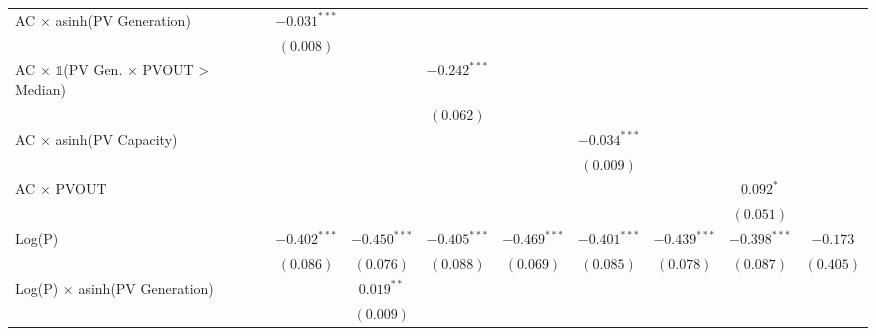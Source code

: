 \begin{table}[htbp]
\begin{center}
\begin{tabular}{l c c c c c c c c}
AC $\times$ asinh(PV Generation)                          & $-0.031^{***}$ &                &                &                &                &                &                &               \\
                                                          & $(0.008)$      &                &                &                &                &                &                &               \\
AC $\times$ $\mathds{1}$(PV Gen. $\times$ PVOUT > Median) &                &                & $-0.242^{***}$ &                &                &                &                &               \\
                                                          &                &                & $(0.062)$      &                &                &                &                &               \\
AC $\times$ asinh(PV Capacity)                            &                &                &                &                & $-0.034^{***}$ &                &                &               \\
                                                          &                &                &                &                & $(0.009)$      &                &                &               \\
AC $\times$ PVOUT                                         &                &                &                &                &                &                & $0.092^{*}$    &               \\
                                                          &                &                &                &                &                &                & $(0.051)$      &               \\
Log(P)                                                    & $-0.402^{***}$ & $-0.450^{***}$ & $-0.405^{***}$ & $-0.469^{***}$ & $-0.401^{***}$ & $-0.439^{***}$ & $-0.398^{***}$ & $-0.173$      \\
                                                          & $(0.086)$      & $(0.076)$      & $(0.088)$      & $(0.069)$      & $(0.085)$      & $(0.078)$      & $(0.087)$      & $(0.405)$     \\
Log(P) $\times$ asinh(PV Generation)                      &                & $0.019^{**}$   &                &                &                &                &                &               \\
                                                          &                & $(0.009)$      &                &                &                &                &                &               \\

\end{tabular}
\end{center}
\end{table}
